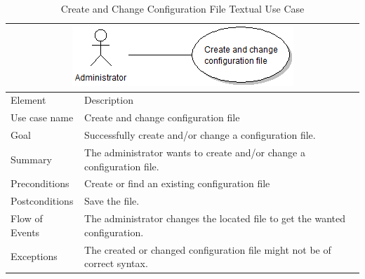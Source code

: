 \begin{table}[htbp] \footnotesize \center
\caption{Create and Change Configuration File Textual Use Case\label{tab:textual:configure}}
\begin{tabularx}{\textwidth}{l X}
	\multicolumn{2}{c}{\includegraphics[scale=0.8]{./planning/img/uc_configurate}} \\
	\toprule
	Element & Description\\
	\midrule
	Use case name & Create and change configuration file\\
	Goal & Successfully create and/or change a configuration file. \\
	Summary & The administrator wants to create and/or change a configuration file. \\
	Preconditions & Create or find an existing configuration file \\
	Postconditions & Save the file.\\
	\midrule
	Flow of Events & The administrator changes the located file to get the wanted configuration.  \\
	\midrule
	Exceptions & The created or changed configuration file might not be of correct syntax. \\
	\bottomrule
\end{tabularx}
\end{table}

